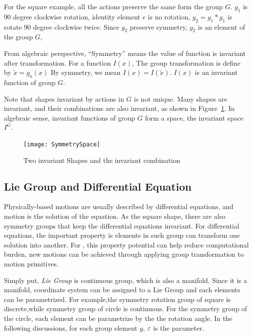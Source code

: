 For the square example, all the actions preserve the same form the group $G$.
$g_1$ is  $90$ degree clockwise rotation, identity element $e$ is no rotation,
$g_2=g_1*g_1$ is rotate $90$ degree clockwise twice.
Since $g_2$ preserve symmetry, $g_2$ is an element of the group $G$, 


From algebraic perspective, ``Symmetry'' means the value of function is invariant after transformation.
For a function $I(x)$,
The group transformation is define by $\tilde{x}=g_a(x)$
By symmetry, we mean $I(x)=I(\tilde{x})$.
$I(x)$ is an invariant function of group $G$.


Note that  shapes invariant by actions in $G$ is not unique.
Many shapes are invariant, and their combinations are also invariant, as shown in Figure~\ref{fig:SymmetrySpace}. 
In algebraic sense,  invariant functions of group $G$ form a space, the invariant space $I^G$.


\begin{figure}[!htbp]
  \begin{center}
    \texttt{[image: SymmetrySpace]}
    \caption{Two invariant Shapes and the invariant combination}
    \label{fig:SymmetrySpace}
\end{center}
\end{figure}

\subsection{Lie Group and Differential Equation}
Physically-based motions are usually described by differential equations, and motion is the solution of the equation.
As the square shape, there are also symmetry groups that keep the differential equations invariant.
For differential equations, the important property is elements in such group can transform one solution into another\citep{olver1986applications}.
For \cms, this property potential can help reduce computational burden, new motions can be achieved through applying group transformation to motion primitives.




Simply put, \emph{Lie Group} is continuous group, which is also a manifold.
Since it is a manifold, coordinate system can be assigned to a Lie Group and each elements can be parametrized.
For example,the symmetry rotation group of square is discrete,while symmetry group of circle is continuous.
For the symmetry group of the circle, each element can be parametrize by the the rotation angle.
In the following discussions, for each group element $g$, $\varepsilon$ is the parameter.

